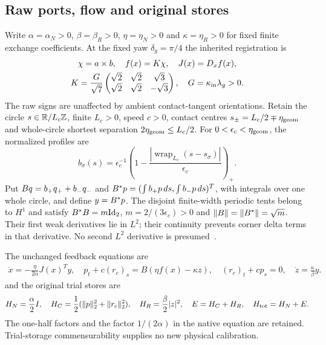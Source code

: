\subsection{Raw ports, flow and original stores}\label{sec:exchange}
Write $\alpha=\alpha_N>0$, $\beta=\beta_R>0$, $\eta=\eta_N>0$ and $\kappa=\eta_R>0$ for fixed finite exchange coefficients. At the fixed yaw $\delta_g=\pi/4$ the inherited registration is
\begin{equation}\label{eq:a04}%
\begin{gathered}
\chi=a\times b,\quad f(x)=K\chi,\quad J(x)=D_xf(x),\\ K=\frac G{\sqrt7}\begin{pmatrix}\sqrt2&\sqrt2&\sqrt3\\
\sqrt2&\sqrt2&-\sqrt3\end{pmatrix},\quad G=\kappa_{\rm in}\lambda_g>0 .
\end{gathered}
\end{equation}
The raw signs are unaffected by ambient contact-tangent orientations. Retain the circle $s\in\mathbb R/L_c\mathbb Z$, finite $L_c>0$, speed $c>0$, contact centres $s_\pm=L_c/2\mp\eta_{\rm geom}$ and whole-circle shortest separation $2\eta_{\rm geom}\le L_c/2$. For $0<\epsilon_c<\eta_{\rm geom}$, the normalized profiles are
\[
b_\sigma(s)=\epsilon_c^{-1}
\left(1-\frac{|\operatorname{wrap}_{L_c}(s-s_\sigma)|}{\epsilon_c}\right)_+ .
\]
Put $B q=b_+q_++b_-q_-$ and $B^*p=(\int b_+p\,ds,\int b_-p\,ds)^T$, with integrals over one whole circle, and define $y=B^*p$.
The disjoint finite-width periodic tents belong to $H^1$ and satisfy
$B^*B=m\mathrm{Id}_2$, $m=2/(3\epsilon_c)>0$ and $\|B\|=\|B^*\|=\sqrt m$.
Their first weak derivatives lie in $L^2$; their continuity prevents corner delta terms in that derivative. No second $L^2$ derivative is presumed~\cite[Section 3]{rx}.

The unchanged feedback equations are
\begin{equation}\label{eq:a05}%
\begin{gathered}
\dot x=-\frac{\eta}{2\alpha}J(x)^Ty,\quad
p_t+c(r_c)_s=B(\eta f(x)-\kappa z),\quad
(r_c)_t+cp_s=0,\quad \dot z=\frac{\kappa}{\beta}y.
\end{gathered}
\end{equation}
and the original trial stores are
\begin{equation}\label{eq:a06}%
\begin{gathered}
H_N=\frac\alpha2 I,\quad H_C=\frac12(\|p\|_2^2+\|r_c\|_2^2),
\quad H_R=\frac\beta2|z|^2,\quad E=H_C+H_R,\quad H_{\rm tot}=H_N+E.
\end{gathered}
\end{equation}
The one-half factors and the factor $1/(2\alpha)$ in the native equation are retained. Trial-storage commensurability supplies no new physical calibration.

